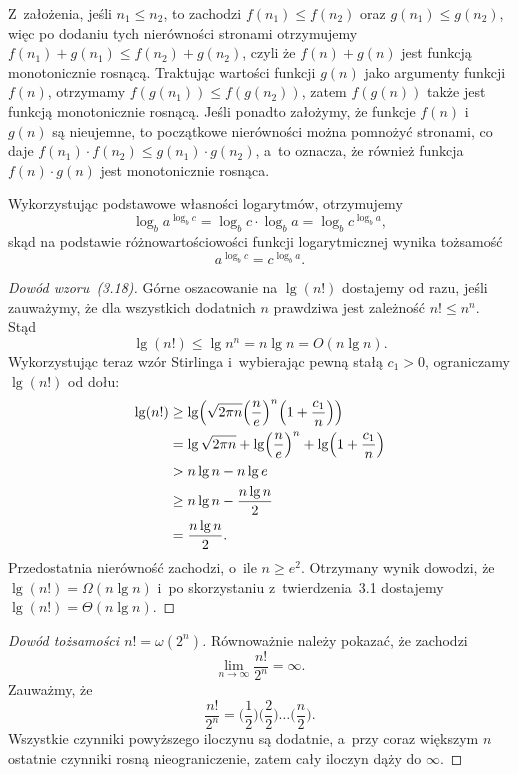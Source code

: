 
\exercise %
Z~założenia, jeśli $n_1\le n_2$, to zachodzi $f(n_1)\le f(n_2)$ oraz $g(n_1)\le g(n_2)$, więc po dodaniu tych nierówności stronami otrzymujemy $f(n_1)+g(n_1)\le f(n_2)+g(n_2)$, czyli że $f(n)+g(n)$ jest funkcją monotonicznie rosnącą. Traktując wartości funkcji $g(n)$ jako argumenty funkcji $f(n)$, otrzymamy $f(g(n_1))\le f(g(n_2))$, zatem $f(g(n))$ także jest funkcją monotonicznie rosnącą. Jeśli ponadto założymy, że funkcje $f(n)$ i~$g(n)$ są nieujemne, to początkowe nierówności można pomnożyć stronami, co daje $f(n_1)\cdot f(n_2)\le g(n_1)\cdot g(n_2)$, a~to oznacza, że również funkcja $f(n)\cdot g(n)$ jest monotonicznie rosnąca.

\exercise %
Wykorzystując podstawowe własności logarytmów, otrzymujemy
\[
	\log_ba^{\log_bc} = \log_bc\cdot\log_ba = \log_bc^{\log_ba},
\]
skąd na podstawie różnowartościowości funkcji logarytmicznej wynika tożsamość
\[
	a^{\log_bc} = c^{\log_ba}.
\]

\exercise %
\begin{proof}[Dowód wzoru~(3.18)]
	Górne oszacowanie na $\lg(n!)$ dostajemy od razu, jeśli zauważymy, że dla wszystkich dodatnich $n$ prawdziwa jest zależność $n!\le n^n$. Stąd
	\[
		\lg(n!) \le \lg n^n = n\lg n = O(n\lg n).
	\]
	Wykorzystując teraz wzór Stirlinga i~wybierając pewną stałą $c_1>0$, ograniczamy $\lg(n!)$ od dołu:
	\begin{align*}
		\lg(n!) &\ge \lg\Bigl(\sqrt{2\pi n}\Bigl(\frac{n}{e}\Bigr)^n\Bigl(1+\frac{c_1}{n}\Bigr)\Bigr) \\
		&= \lg\sqrt{2\pi n}+\lg\Bigl(\frac{n}{e}\Bigr)^n+\lg\Bigl(1+\frac{c_1}{n}\Bigr) \\
		&> n\lg n-n\lg e \\
		&\ge n\lg n-\frac{n\lg n}{2} \\
		&= \frac{n\lg n}{2}.
	\end{align*}
	Przedostatnia nierówność zachodzi, o~ile $n\ge e^2$. Otrzymany wynik dowodzi, że $\lg(n!)=\Omega(n\lg n)$ i~po skorzystaniu z~twierdzenia~3.1 dostajemy $\lg(n!)=\Theta(n\lg n)$.
\end{proof}

\begin{proof}[Dowód tożsamości $n!=\omega(2^n)$]
	Równoważnie należy pokazać, że zachodzi
	\[
		\lim_{n\to\infty}\frac{n!}{2^n} = \infty.
	\]
	Zauważmy, że
	\[
	    \frac{n!}{2^n} = \biggl(\frac{1}{2}\biggr)\biggl(\frac{2}{2}\biggr)\dots\biggl(\frac{n}{2}\biggr).
	\]
	Wszystkie czynniki powyższego iloczynu są dodatnie, a~przy coraz większym $n$ ostatnie czynniki rosną nieograniczenie, zatem cały iloczyn dąży do $\infty$.
\end{proof}

